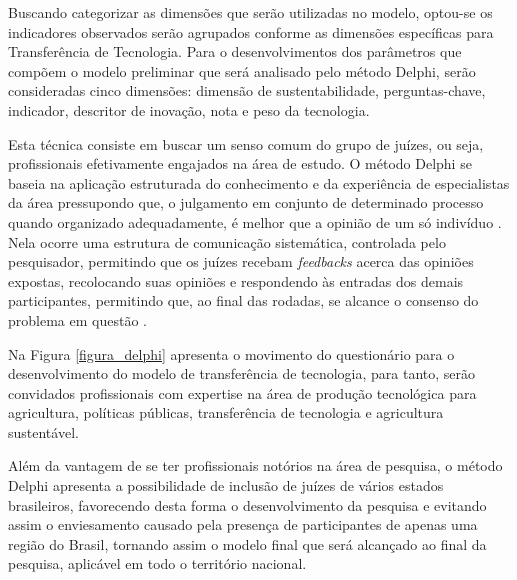 Buscando categorizar as dimensões que serão utilizadas no modelo, optou-se os indicadores observados serão agrupados conforme as dimensões específicas para Transferência de Tecnologia. Para o desenvolvimentos dos parâmetros que compõem o modelo preliminar que será analisado pelo método Delphi, serão consideradas cinco dimensões: dimensão de sustentabilidade, perguntas-chave, indicador, descritor de inovação, nota e peso da tecnologia.

Esta técnica consiste em buscar um senso comum do grupo de juízes, ou seja, profissionais efetivamente engajados na área de estudo. O método Delphi se baseia na aplicação estruturada do conhecimento e da experiência de especialistas da área pressupondo que, o julgamento em conjunto de determinado processo quando organizado adequadamente, é melhor que a opinião de um só indivíduo \cite{faro_tecnica_1997,santiago_matriz_2012}. Nela  ocorre uma estrutura de comunicação sistemática, controlada pelo pesquisador, permitindo que os juízes recebam \textit{feedbacks} acerca das opiniões expostas, recolocando suas opiniões e respondendo às entradas dos demais participantes, permitindo que, ao final das rodadas, se alcance o consenso do problema em questão \cite{massaroli_metodo_2017}. 

Na Figura \ref{figura_delphi} apresenta o movimento do questionário para o desenvolvimento do modelo de transferência de tecnologia, para tanto, serão convidados profissionais com expertise na área de produção tecnológica para agricultura, políticas públicas, transferência de tecnologia e agricultura sustentável. 

Além da vantagem de se ter profissionais notórios na área de pesquisa, o método Delphi apresenta a  possibilidade de inclusão de juízes de vários estados brasileiros, favorecendo desta forma o desenvolvimento da pesquisa e evitando assim o enviesamento causado pela presença de participantes de apenas uma região do Brasil, tornando assim o modelo final que será alcançado ao final da pesquisa, aplicável em todo o território nacional.


